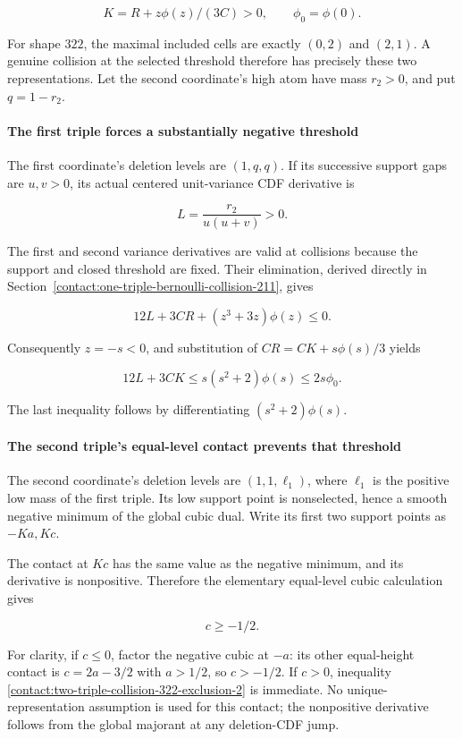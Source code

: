 \[
 K=R+z\phi(z)/(3C)>0,\qquad \phi_0=\phi(0).
\]

For shape $322$, the maximal included cells are exactly $(0,2)$ and
$(2,1)$. A genuine collision at the selected threshold therefore has
precisely these two representations. Let the second coordinate's high
atom have mass $r_2>0$, and put $q=1-r_2$.

\paragraph{The first triple forces a substantially negative threshold}

The first coordinate's deletion levels are $(1,q,q)$. If its successive
support gaps are $u,v>0$, its actual centered unit-variance
CDF derivative is

\[
 L=\frac{r_2}{u(u+v)}>0.
\]

The first and second variance derivatives are valid at collisions because
the support and closed threshold are fixed. Their elimination, derived
directly in
Section~\ref{contact:one-triple-bernoulli-collision-211},
gives

\[
 12L+3CR+(z^3+3z)\phi(z)\leq0.
\]

Consequently $z=-s<0$, and substitution of $CR=CK+s \phi(s)/3$ yields

\[
 12L+3CK\leq s(s^2+2)\phi(s)\leq2s\phi_0.
\tag{B.21.1}\label{contact:two-triple-collision-322-exclusion-1}
\]

The last inequality follows by differentiating $(s^2+2)\phi(s)$.

\paragraph{The second triple's equal-level contact prevents that threshold}

The second coordinate's deletion levels are $(1,1,\ell_1)$, where $\ell_1$
is the positive low mass of the first triple. Its low support point is
nonselected, hence a smooth negative minimum of the global cubic dual.
Write its first two support points as $-Ka,Kc$.

The contact at $Kc$ has the same value as the negative minimum, and its
derivative is nonpositive. Therefore the elementary equal-level cubic
calculation gives

\[
 c\geq-1/2.
\tag{B.21.2}\label{contact:two-triple-collision-322-exclusion-2}
\]

For clarity, if $c\le 0$, factor the negative cubic at $-a$: its other
equal-height contact is $c=2a-3/2$ with $a>1/2$, so $c>-1/2$.
If $c>0$, inequality \eqref{contact:two-triple-collision-322-exclusion-2} is immediate. No unique-representation assumption is
used for this contact; the nonpositive derivative follows from the
global majorant at any deletion-CDF jump.

